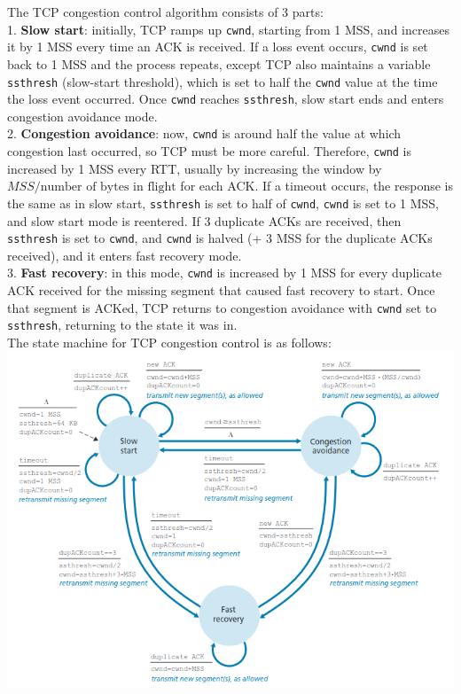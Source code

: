 The TCP congestion control algorithm consists of 3 parts:\\
1. \textbf{Slow start}: initially, TCP ramps up \verb|cwnd|, starting from 1 MSS, and increases it by 1 MSS every time an ACK is received. If a loss event occurs, \verb|cwnd| is set back to 1 MSS and the process repeats, except TCP also maintains a variable \verb|ssthresh| (slow-start threshold), which is set to half the \verb|cwnd| value at the time the loss event occurred. Once \verb|cwnd| reaches \verb|ssthresh|, slow start ends and enters congestion avoidance mode.\\
2. \textbf{Congestion avoidance}: now, \verb|cwnd| is around half the value at which congestion last occurred, so TCP must be more careful. Therefore, \verb|cwnd| is increased by 1 MSS every RTT, usually by increasing the window by $MSS/\text{number of bytes in flight}$ for each ACK. If a timeout occurs, the response is the same as in slow start, \verb|ssthresh| is set to half of \verb|cwnd|, \verb|cwnd| is set to 1 MSS, and slow start mode is reentered. If 3 duplicate ACKs are received, then \verb|ssthresh| is set to \verb|cwnd|, and \verb|cwnd| is halved (+ 3 MSS for the duplicate ACKs received), and it enters fast recovery mode.\\
3. \textbf{Fast recovery}: in this mode, \verb|cwnd| is increased by 1 MSS for every duplicate ACK received for the missing segment that caused fast recovery to start. Once that segment is ACKed, TCP returns to congestion avoidance with \verb|cwnd| set to \verb|ssthresh|, returning to the state it was in.\\
The state machine for TCP congestion control is as follows:
\includegraphics[width=\linewidth]{../images/w5n4tcpCongestionFsm.png}\\

